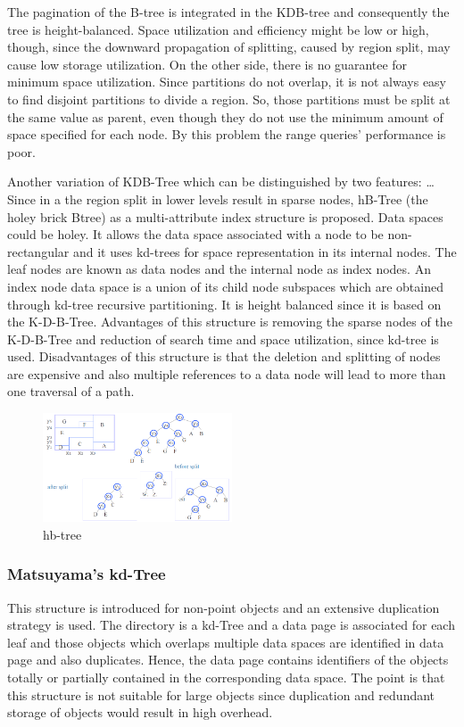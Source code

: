 \documentclass[a4paper,12pt]{article}
\begin{document}
The pagination of the B-tree is integrated in the KDB-tree and consequently the tree is height-balanced. Space utilization and efficiency might be low or high, though, since the downward propagation of splitting, caused by region split, may cause low storage utilization. On the other side, there is no guarantee for minimum space utilization. Since partitions do not overlap, it is not always easy to find disjoint partitions to divide a region. So, those partitions must be split at the same value as parent, even though they do not use the minimum amount of space specified for each node. By this problem the range queries' performance is poor. 

Another variation of KDB-Tree which can be distinguished by two features: …
Since in a the region split in lower levels result in sparse nodes, hB-Tree (the holey brick Btree) as a multi-attribute index structure is proposed. Data spaces could be holey. It allows the data space associated with a node to be non-rectangular and it uses kd-trees for space representation in its internal nodes. The leaf nodes are known as data nodes and the internal node as index nodes. An index node data space is a union of its child node subspaces which are obtained through kd-tree recursive partitioning. It is height balanced since it is based on the K-D-B-Tree. 
Advantages of this structure is removing the sparse nodes of the K-D-B-Tree and reduction of search time and space utilization, since kd-tree is used. 
Disadvantages of this structure is that the deletion and splitting of nodes are expensive and also multiple references to a data node will lead to more than one traversal of a path.

\begin{figure}
\centering
\includegraphics[width=0.5\textwidth]{hbtree}
\caption{hb-tree}
\label{fighbtree}
\end{figure}

\subsubsection{Matsuyama’s kd-Tree}
This structure is introduced for non-point objects and an extensive duplication strategy is used. The directory is a kd-Tree and a data page is associated for each leaf and those objects which overlaps multiple data spaces are identified in data page and also duplicates. Hence, the data page contains identifiers of the objects totally or partially contained in the corresponding data space.
The point is that this structure is not suitable for large objects since duplication and redundant storage of objects would result in high overhead.
\end{document}
